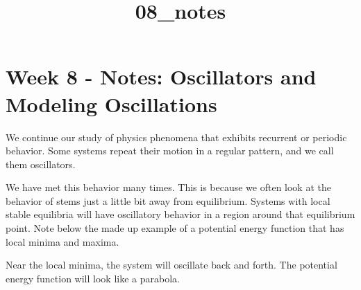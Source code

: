 \documentclass[11pt]{article}
\title{08\_notes}
\begin{document}
    
    \maketitle
    
    

    
    \section{Week 8 - Notes: Oscillators and Modeling
Oscillations}\label{week-8---notes-oscillators-and-modeling-oscillations}

We continue our study of physics phenomena that exhibits recurrent or
periodic behavior. Some systems repeat their motion in a regular
pattern, and we call them oscillators.

We have met this behavior many times. This is because we often look at
the behavior of stems just a little bit away from equilibrium. Systems
with local stable equilibria will have oscillatory behavior in a region
around that equilibrium point. Note below the made up example of a
potential energy function that has local minima and maxima.

Near the local minima, the system will oscillate back and forth. The
potential energy function will look like a parabola.
\end{document}

